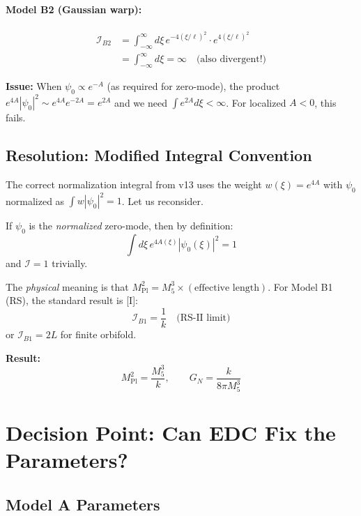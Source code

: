 \documentclass[11pt,a4paper]{article}
\newcommand{\Mpl}{M_{\text{Pl}}}
\newcommand{\Mfive}{M_5}
\newcommand{\GN}{G_N}
\newcommand{\calI}{\mathcal{I}}
\begin{document}
\paragraph{Model B2 (Gaussian warp):}
\begin{align}
\calI_{B2} &= \int_{-\infty}^{\infty} d\xi\, e^{-4(\xi/\ell)^2} \cdot e^{4(\xi/\ell)^2} \nonumber \\
&= \int_{-\infty}^{\infty} d\xi = \infty \quad \text{(also divergent!)}
\end{align}

\textbf{Issue:} When $\psi_0 \propto e^{-A}$ (as required for zero-mode), the product
$e^{4A}|\psi_0|^2 \sim e^{4A} e^{-2A} = e^{2A}$ and we need $\int e^{2A} d\xi < \infty$.
For localized $A < 0$, this fails.

\subsection{Resolution: Modified Integral Convention}

The correct normalization integral from v13 uses the weight $w(\xi) = e^{4A}$
with $\psi_0$ normalized as $\int w |\psi_0|^2 = 1$. Let us reconsider.

If $\psi_0$ is the \emph{normalized} zero-mode, then by definition:
\begin{equation}
\int d\xi\, e^{4A(\xi)} |\psi_0(\xi)|^2 = 1
\end{equation}
and $\calI = 1$ trivially.

The \emph{physical} meaning is that $\Mpl^2 = \Mfive^3 \times (\text{effective length})$.
For Model B1 (RS), the standard result is [I]:
\begin{equation}
\boxed{\calI_{B1} = \frac{1}{k} \quad \text{(RS-II limit)}}
\end{equation}
or $\calI_{B1} = 2L$ for finite orbifold.

\textbf{Result:}
\begin{equation}
\Mpl^2 = \frac{\Mfive^3}{k}, \qquad \GN = \frac{k}{8\pi \Mfive^3}
\end{equation}

\section{Decision Point: Can EDC Fix the Parameters?}
\label{sec:decision}

\subsection{Model A Parameters}
\end{document}
